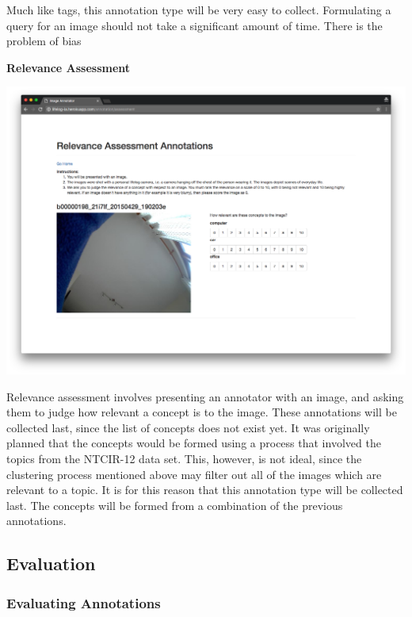 Much like tags, this annotation type will be very easy to collect. Formulating a query for an image should not take a significant amount of time. There is the problem of bias 

\newpage
\textbf{Relevance Assessment}

\includegraphics[width=\textwidth]{images/rel-ass-interface}

Relevance assessment involves presenting an annotator with an image, and asking them to judge how relevant a concept is to the image. These annotations will be collected last, since the list of concepts does not exist yet. It was originally planned that the concepts would be formed using a process that involved the topics from the NTCIR-12 data set. This, however, is not ideal, since the clustering process mentioned above may filter out all of the images which are relevant to a topic. It is for this reason that this annotation type will be collected last. The concepts will be formed from a combination of the previous annotations.


\subsection{Evaluation}

\subsubsection{Evaluating Annotations}

